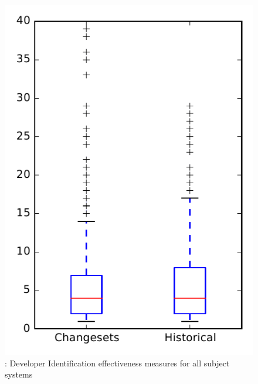 
\begin{figure}
\centering
\includegraphics[height=0.4\textheight]{figures/dit/rq2_overview}
\caption{\dtwo: Developer Identification effectiveness measures for all subject systems}
\label{fig:dit:rq2:overview}
\end{figure}
